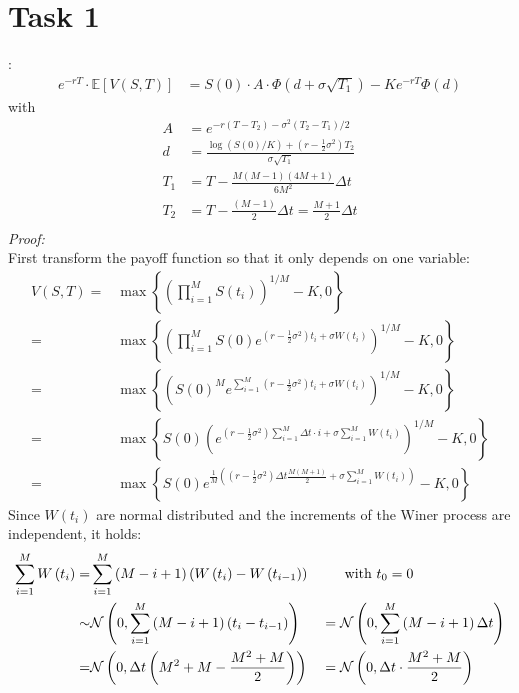 \documentclass[a4paper,10pt]{article}
\title{}
\author{}
\begin{document}
\section*{Task 1}

:
\begin{align*}
  e^{-r T}\cdot \mathbb{E}\left[ V\left(S,T\right)\right] &=S(0)\cdot A \cdot \Phi\left(d+\sigma \sqrt{T_1}\right)-K e^{-r T} \Phi(d)
\end{align*}
with
\begin{align*}
  A &=e^{-r\left(T-T_2\right)-\sigma^2\left(T_2-T_1\right)/2}\\
  d &=\frac{\log\left(S(0)/K\right)+\left(r-\frac{1}{2}\sigma^2\right)T_2}{\sigma \sqrt{T_1}}\\
  T_1&=T-\frac{M\left(M-1\right)\left(4M+1\right)}{6M^2}\Delta t\\
  T_2&=T-\frac{\left(M-1\right)}{2}\Delta t=\frac{M+1}{2}\Delta t\\
\end{align*}
{\textit{Proof:}}\\
First transform the payoff function so that it only depends on one variable:
\begin{align*}
 V\left(S,T\right)=& \max \left\{\left(\prod_{i=1}^M S\left(t_i\right)\right)^{1/M}-K,0\right\}\\
  =& \max \left\{\left(\prod_{i=1}^M  S\left(0\right) e^{\left(r-\frac{1}{2}\sigma^2\right)t_i+\sigma W\left(t_i\right)}  \right)^{1/M}-K,0\right\}\\
  =& \max \left\{\left(S\left(0\right)^M e^{\sum_{i=1}^M\left(r-\frac{1}{2}\sigma^2\right)t_i+\sigma W\left(t_i\right)}  \right)^{1/M}-K,0\right\}\\
  =& \max \left\{S\left(0\right)\left( e^{\left(r-\frac{1}{2}\sigma^2\right)\sum_{i=1}^M \Delta t \cdot i+\sigma \sum_{i=1}^M W\left(t_i\right)}  \right)^{1/M}-K,0\right\}\\
  =& \max \left\{S\left(0\right) e^{\frac{1}{M}\left(\left(r-\frac{1}{2}\sigma^2\right) \Delta t \frac{M\left(M+1\right)}{2}+\sigma \sum_{i=1}^M W\left(t_i\right)\right)} -K,0\right\}
\end{align*}
Since $W(t_i)$ are normal distributed and the increments of the Winer process are independent, it holds:
\begin{align*}
 \sum_{i=1}^{M}W\left(t_i\right)=&\sum_{i=1}^{M}\left(M-i+1\right)\left(W\left(t_i\right)-W\left(t_{i-1}\right)\right)&&\text{ $ $ $ $ $ $ $ $ with $t_0=0$}\\
 \sim  & \mathcal{N}\left(0, \sum_{i=1}^{M} \left(M-i+1\right) \left(t_i - t_{i-1}\right)\right)&&= \mathcal{N}\left(0, \sum_{i=1}^{M} \left(M-i+1\right) \Delta t\right)\\
 =& \mathcal{N}\left(0, \Delta t\left( M^2+M-\frac{M^2+M}{2}\right) \right)&&=\mathcal{N}\left(0, \Delta t\cdot\frac{M^2+M}{2} \right)\\
\end{align*}
\end{document}
